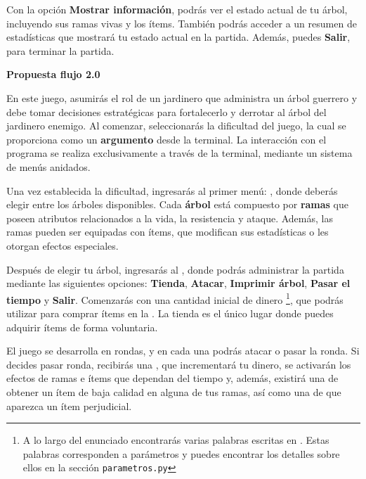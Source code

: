
Con la opción \textbf{Mostrar información}, podrás ver el estado actual de tu árbol, incluyendo sus ramas vivas y los ítems. También podrás acceder a un resumen de estadísticas que mostrará tu estado actual en la partida. Además, puedes \textbf{Salir}, para terminar la partida.






\textbf{Propuesta flujo 2.0}

En este juego, asumirás el rol de un jardinero que administra un árbol guerrero y debe tomar decisiones estratégicas para fortalecerlo y derrotar al árbol del jardinero enemigo. Al comenzar, seleccionarás la dificultad del juego, la cual se proporciona como un \textbf{argumento} desde la terminal. La interacción con el programa se realiza exclusivamente a través de la terminal, mediante un sistema de menús anidados.

Una vez establecida la dificultad, ingresarás al primer menú: , donde deberás elegir entre los árboles disponibles. Cada \textbf{árbol} está compuesto por \textbf{ramas} que poseen atributos relacionados a la  vida, la resistencia y ataque. Además, las ramas pueden ser equipadas con ítems, que modifican sus estadísticas o les otorgan efectos especiales.

Después de elegir tu árbol, ingresarás al , donde podrás administrar la partida mediante las siguientes opciones: \textbf{Tienda}, \textbf{Atacar}, \textbf{Imprimir árbol}, \textbf{Pasar el tiempo} y \textbf{Salir}. Comenzarás con una cantidad inicial de dinero \footnote{A lo largo del enunciado encontrarás varias palabras escritas en . Estas palabras corresponden a parámetros y puedes encontrar los detalles sobre ellos en la sección \texttt{parametros.py}}, que podrás utilizar para comprar ítems en la  . La tienda es el único lugar donde puedes adquirir ítems de forma voluntaria.

El juego se desarrolla en rondas, y en cada una podrás atacar o pasar la ronda. Si decides pasar ronda, recibirás una , que incrementará tu dinero, se activarán los efectos de ramas e ítems que dependan del tiempo y, además, existirá una  de obtener un ítem de baja calidad en alguna de tus ramas, así como una  de que aparezca un ítem perjudicial.


